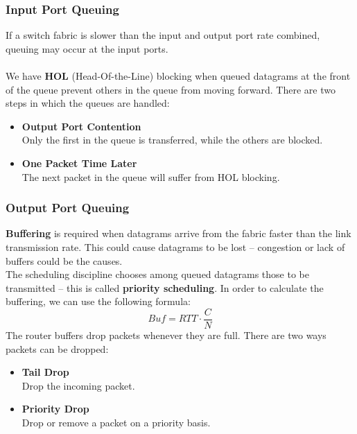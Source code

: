 \documentclass{article}
\begin{document}
\subsubsection{Input Port Queuing}
If a switch fabric is slower than the input and output port rate combined, queuing may occur at the input ports. \\ \\
We have \textbf{HOL} (Head-Of-the-Line) blocking when queued datagrams at the front of the queue prevent others in the queue from moving forward. There are two steps in which the queues are handled:

\begin{itemize}
	\item \textbf{Output Port Contention}
	\vspace{.2cm} \\
	Only the first in the queue is transferred, while the others are blocked.
	
	\item \textbf{One Packet Time Later}
	\vspace{.2cm} \\
	The next packet in the queue will suffer from HOL blocking.
\end{itemize}

\subsubsection{Output Port Queuing}
\textbf{Buffering} is required when datagrams arrive from the fabric faster than the link transmission rate. This could cause datagrams to be lost -- congestion or lack of buffers could be the causes. \\
The scheduling discipline chooses among queued datagrams those to be transmitted -- this is called \textbf{priority scheduling}. In order to calculate the buffering, we can use the following formula:
\[ Buf = RTT \cdot \frac{C}{N} \]
The router buffers drop packets whenever they are full. There are two ways packets can be dropped:

\begin{itemize}
	\item \textbf{Tail Drop}
	\vspace{.2cm} \\
	Drop the incoming packet.
	
	\item \textbf{Priority Drop}
	\vspace{.2cm} \\
	Drop or remove a packet on a priority basis.
\end{itemize}
\end{document}
